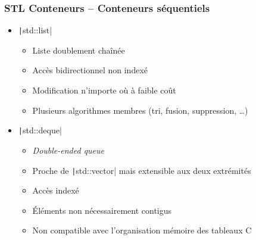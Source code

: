 \documentclass[C++.tex]{subfiles}
\begin{document}
\begin{frame}[fragile]
	\frametitle{STL Conteneurs -- Conteneurs séquentiels}
	\begin{itemize}
		\item \texttt|std::list|
		\begin{itemize}
			\item Liste doublement chaînée
			\item Accès bidirectionnel non indexé
			\item Modification n'importe où à faible coût
			\item Plusieurs algorithmes membres (tri, fusion, suppression, \ldots{})
		\end{itemize}

		\item \texttt|std::deque|
		\begin{itemize}
			\item \textit{Double-ended queue}
			\item Proche de \texttt|std::vector| mais extensible aux deux extrémités
			\item Accès indexé
			\item Éléments non nécessairement contigus
			\item Non compatible avec l'organisation mémoire des tableaux C
		\end{itemize}
	\end{itemize}
\end{frame}
\end{document}
